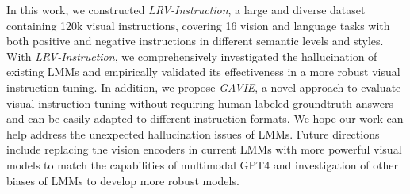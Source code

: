 \vspace{-0.1in}
In this work, we constructed \textit{LRV-Instruction}, a large and diverse dataset containing 120k visual instructions, covering 16 vision and language tasks with both positive and negative instructions in different semantic levels and styles. With \textit{LRV-Instruction}, we  comprehensively investigated the hallucination of existing LMMs and empirically validated its effectiveness in a more robust visual instruction tuning. In addition, we propose \textit{GAVIE}, a novel approach to evaluate visual instruction tuning without requiring human-labeled groundtruth answers and can be easily adapted to different instruction formats. We hope our work can help address the unexpected hallucination issues of LMMs. Future directions include replacing the vision encoders in current LMMs with more powerful visual models to match the capabilities of multimodal GPT4 and investigation of other biases of LMMs to develop more robust models.



